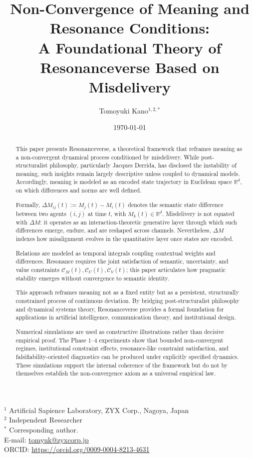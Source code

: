 \documentclass[11pt,a4paper]{article}
\title{Non-Convergence of Meaning and Resonance Conditions:\\
A Foundational Theory of Resonanceverse Based on Misdelivery}
\author{%
Tomoyuki Kano$^{1,2,*}$
}
\date{\today}
\theoremstyle{definition}
\begin{document}
\maketitle

\begin{center}
\small
$^{1}$ Artificial Sapience Laboratory, ZYX Corp., Nagoya, Japan\\
$^{2}$ Independent Researcher\\
$^{*}$ Corresponding author.\\
E-mail: \url{tomyuk@zyxcorp.jp}\\
ORCID: \url{https://orcid.org/0009-0004-8213-4631}
\end{center}

\vspace{0.5cm}

\begin{abstract}
This paper presents Resonanceverse, a theoretical framework that reframes meaning as a non-convergent dynamical process conditioned by misdelivery. While post-structuralist philosophy, particularly Jacques Derrida, has disclosed the instability of meaning, such insights remain largely descriptive unless coupled to dynamical models. Accordingly, meaning is modeled as an encoded state trajectory in Euclidean space $\mathbb{R}^d$, on which differences and norms are well defined.

Formally, $\Delta M_{ij}(t) := M_j(t) - M_i(t)$ denotes the semantic state difference between two agents $(i, j)$ at time $t$, with $M_k(t) \in \mathbb{R}^d$. Misdelivery is not equated with $\Delta M$: it operates as an interaction-theoretic generative layer through which such differences emerge, endure, and are reshaped across channels. Nevertheless, $\Delta M$ indexes how misalignment evolves in the quantitative layer once states are encoded.

Relations are modeled as temporal integrals coupling contextual weights and differences. Resonance requires the joint satisfaction of semantic, uncertainty, and value constraints $\mathcal{C}_M(t), \mathcal{C}_U(t), \mathcal{C}_V(t)$; this paper articulates how pragmatic stability emerges without convergence to semantic identity.

This approach reframes meaning not as a fixed entity but as a persistent, structurally constrained process of continuous deviation. By bridging post-structuralist philosophy and dynamical systems theory, Resonanceverse provides a formal foundation for applications in artificial intelligence, communication theory, and institutional design.

Numerical simulations are used as constructive illustrations rather than decisive empirical proof. The Phase 1--4 experiments show that bounded non-convergent regimes, institutional constraint effects, resonance-like constraint satisfaction, and falsifiability-oriented diagnostics can be produced under explicitly specified dynamics. These simulations support the internal coherence of the framework but do not by themselves establish the non-convergence axiom as a universal empirical law.
\end{abstract}
\end{document}
